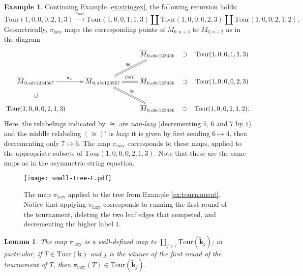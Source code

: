 \documentclass[11pt]{amsart}
\newcommand{\Mbar}{\overline{M}}
\newcommand{\Tour}{\mathrm{Tour}}
\newcommand{\forget}{\pi_{\mathrm{lazy}}}
\newtheorem{lemma}[thm]{Lemma}
\numberwithin{thm}{section}
\numberwithin{equation}{section}
\numberwithin{figure}{section}
\theoremstyle{definition}
\newtheorem{example}[thm]{Example}
\begin{document}
\begin{example} \label{ex:forget} Continuing Example \ref{ex:stringex}, the following recursion holds:
\begin{equation}
\Tour(1,0,0,0,2,1,3) \xrightarrow{\forget} \Tour(1,0,0,1,1,3)   \amalg \Tour(1,0,0,0,2,3) \amalg \Tour(1,0,0,2,1,2).
\end{equation}
Geometrically, $\forget$ maps the corresponding points of $\Mbar_{0,n+3}$ to $\Mbar_{0,n+2}$ as in the diagram
\begin{equation}
\raisebox{4em}{\xymatrix{
&& \Mbar_{0,abc123456} \ar@{}[r]|-*[@]{\supset} & \Tour(1,0,0,1,1,3) \\
\Mbar_{0, abc1234567} \ar[r]^{\pi_4} & \Mbar_{0,abc123567}
\ar@{=}[ru]^{\cong}
\ar@{=}[r]^{(\cong)'}
\ar@{=}[rd]^{\cong} &
\Mbar_{0,abc123456}
\ar@{}[r]|-*[@]{\supset} & \Tour(1,0,0,0,2,3) \\
\Tour(1,0,0,0,2,1,3)
\ar@{}[u]|-*[@]{\cup}
&& \Mbar_{0,abc123456}
\ar@{}[r]|-*[@]{\supset} & \Tour(1,0,0,2,1,2).
}}
\end{equation}
Here, the relabelings indicated by $\cong$ are \emph{non-lazy} (decrementing $5$, $6$ and $7$ by $1$) and the middle relabeling $(\cong)'$ is \emph{lazy}: it is given by first sending $6 \mapsto 4$, then decrementing only $7 \mapsto 6$. The map $\forget$ corresponds to these maps, applied to the appropriate subsets of $\Tour(1, 0, 0, 0, 2, 1, 3)$. Note that these are the same maps as in the asymmetric string equation.
\end{example}

\begin{figure}
    \centering
    \texttt{[image: small-tree-F.pdf]}
    \caption{The map $\forget$ applied to the tree from Example \ref{ex:tournament}.  Notice that applying $\forget$ corresponds to running the first round of the tournament, deleting the two leaf edges that competed, and decrementing the higher label $4$.}
    \label{fig:F}
\end{figure}

\begin{lemma}\label{lem:map}
  The map $\forget$ is a well-defined map to $\coprod_{j>i} \Tour(\widetilde{\mathbf{k}}_j)$; in particular, if $T\in \Tour(\mathbf{k})$ and $j$ is the winner of the first round of the tournament of $T$, then $\forget(T)\in \Tour(\widetilde{\mathbf{k}}_j)$.
\end{lemma}
\end{document}
